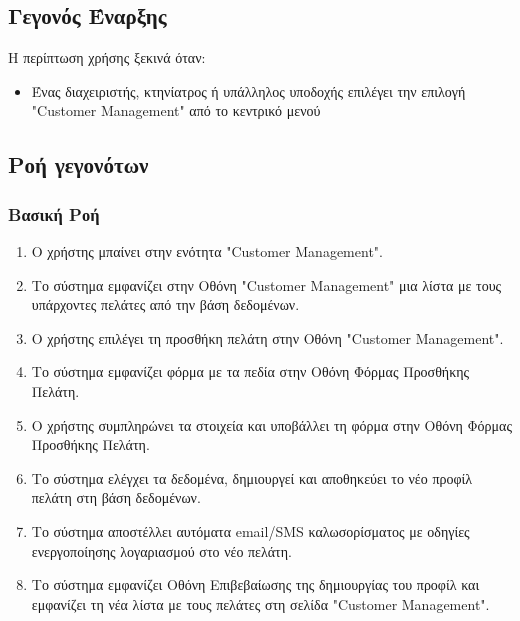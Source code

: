 \documentclass[12pt,a4paper,twoside]{book}
\begin{document}
\subsection{Γεγονός Έναρξης}
Η περίπτωση χρήσης ξεκινά όταν:
\begin{itemize}
  \item Ένας διαχειριστής, κτηνίατρος ή υπάλληλος υποδοχής επιλέγει την επιλογή "Customer Management" από το κεντρικό μενού %
\end{itemize}

\subsection{Ροή γεγονότων}

\subsubsection{Βασική Ροή}
\begin{enumerate}
  \item Ο χρήστης μπαίνει στην ενότητα "Customer Management". %
  \item Το σύστημα εμφανίζει στην Οθόνη "Customer Management" μια λίστα με τους υπάρχοντες πελάτες από την βάση δεδομένων. %
  \item Ο χρήστης επιλέγει τη προσθήκη πελάτη στην Οθόνη "Customer Management". %
  \item Το σύστημα εμφανίζει φόρμα με τα πεδία στην Οθόνη Φόρμας Προσθήκης Πελάτη. %
  \item Ο χρήστης συμπληρώνει τα στοιχεία και υποβάλλει τη φόρμα στην Οθόνη Φόρμας Προσθήκης Πελάτη.
  \item Το σύστημα ελέγχει τα δεδομένα, δημιουργεί και αποθηκεύει το νέο προφίλ πελάτη στη βάση δεδομένων. %
  \item Το σύστημα αποστέλλει αυτόματα email/SMS καλωσορίσματος με οδηγίες ενεργοποίησης λογαριασμού στο νέο πελάτη. %
  \item Το σύστημα εμφανίζει Οθόνη Επιβεβαίωσης της δημιουργίας του προφίλ και εμφανίζει τη νέα λίστα με τους πελάτες στη σελίδα "Customer Management". %
\end{enumerate}
\end{document}
